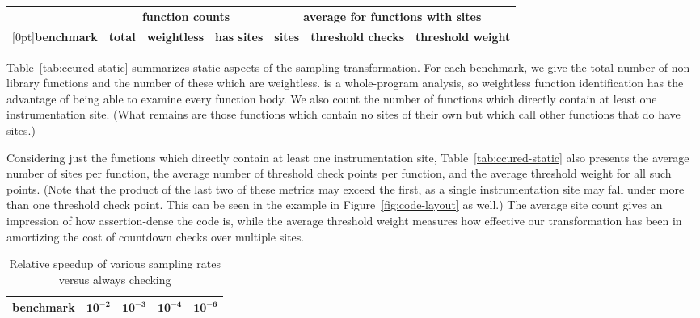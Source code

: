\begin{table*}[tb]
  \centering
  \begin{tabular}{|l|rrr|rrr|}
    \hline
    & \multicolumn{3}{c|}{\textbf{function counts}} & \multicolumn{3}{c|}{\textbf{average for functions with sites}} \\
    \raisebox{1.5ex}[0pt]{\textbf{benchmark}} & \textbf{total} & \textbf{weightless} & \textbf{has sites} & \textbf{sites} & \textbf{threshold checks} & \textbf{threshold weight} \\
    \hline\hline
    
    \hline
    
    \hline
  \end{tabular}
  \caption{Static metrics for \ccured benchmarks.  Olden benchmarks
    are listed first, followed by SPECINT95.}
  \label{tab:ccured-static}
\end{table*}

Table~\ref{tab:ccured-static} summarizes static aspects of the
sampling transformation.  For each benchmark, we give the total number
of non-library functions and the number of these which are weightless.
\ccured is a whole-program analysis, so weightless function
identification has the advantage of being able to examine every
function body.  We also count the number of functions which directly
contain at least one instrumentation site.  (What remains are those
functions which contain no sites of their own but which call other
functions that do have sites.)

Considering just the functions which directly contain at least one
instrumentation site, Table~\ref{tab:ccured-static} also presents the
average number of sites per function, the average number of threshold
check points per function, and the average threshold weight for all
such points.  (Note that the product of the last two of these metrics
may exceed the first, as a single instrumentation site may fall under
more than one threshold check point.  This can be seen in the example
in Figure~\ref{fig:code-layout} as well.)  The average site count
gives an impression of how assertion-dense the code is, while the
average threshold weight measures how effective our transformation has
been in amortizing the cost of countdown checks over multiple sites.

\begin{table}
  \centering
  \begin{tabular}{|l|rrrr|}
    \hline
    \rule{0pt}{2.5ex}
    \textbf{benchmark} & $\mathbf{10^{-2}}$ & $\mathbf{10^{-3}}$ & $\mathbf{10^{-4}}$ & $\mathbf{10^{-6}}$ \\
    \hline\hline
    
    \hline
    
    \hline
  \end{tabular}
  \caption{Relative speedup of various sampling rates versus always checking}
  \label{tab:ccured-density}
\end{table}

